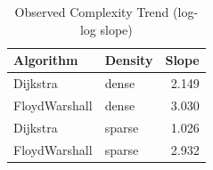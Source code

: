 \begin{table}[H]
\centering
\caption{Observed Complexity Trend (log-log slope)}
\begin{tabular}{llr}
\toprule
Algorithm & Density & Slope\\
\midrule
Dijkstra & dense & 2.149\\
FloydWarshall & dense & 3.030\\
Dijkstra & sparse & 1.026\\
FloydWarshall & sparse & 2.932\\
\bottomrule
\end{tabular}
\end{table}

